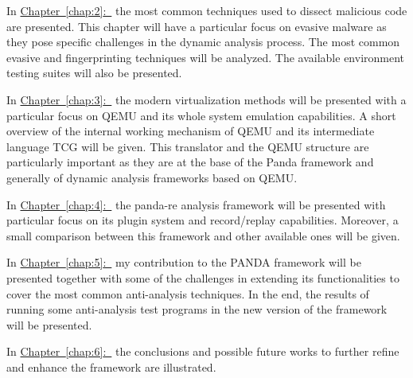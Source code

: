 \medskip
In \hyperref[chap:2]{Chapter~\ref*{chap:2}:~} the most common techniques used to dissect malicious code are presented. This chapter will have a particular focus on evasive malware as they pose specific challenges in the dynamic analysis process. The most common evasive and fingerprinting techniques will be analyzed. The available environment testing suites will also be presented. 


\medskip
In \hyperref[chap:3]{Chapter~\ref*{chap:3}:~} the modern virtualization methods will be presented with a particular focus on QEMU and its whole system emulation capabilities. A short overview of the internal working mechanism of QEMU and its intermediate language TCG will be given. This translator and the QEMU structure are particularly important as they are at the base of the Panda framework and generally of dynamic analysis frameworks based on QEMU.


\medskip
In \hyperref[chap:4]{Chapter~\ref*{chap:4}:~} the panda-re analysis framework will be presented with particular focus on its plugin system and record/replay capabilities. Moreover, a small comparison between this framework and other available ones will be given. 


\medskip
In \hyperref[chap:5]{Chapter~\ref*{chap:5}:~}  my contribution to the PANDA framework will be presented together with some of the challenges in extending its functionalities to cover the most common anti-analysis techniques. In the end, the results of running some anti-analysis test programs in the new version of the framework will be presented.

\medskip
In \hyperref[chap:6]{Chapter~\ref*{chap:6}:~} the conclusions and possible future works to further refine and enhance the framework are illustrated.